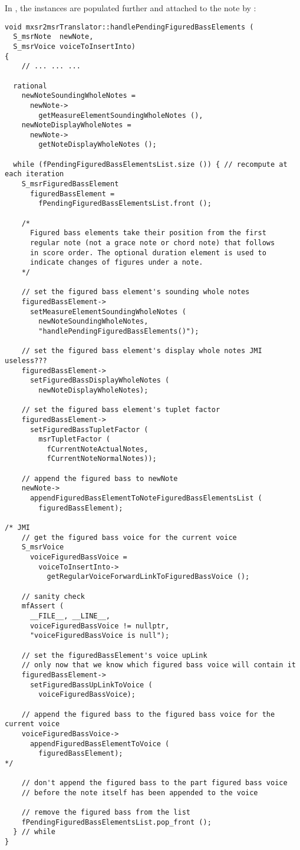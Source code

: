 In , the  instances are populated further and attached to the note by :
\begin{lstlisting}[language=CPlusPlus]
void mxsr2msrTranslator::handlePendingFiguredBassElements (
  S_msrNote  newNote,
  S_msrVoice voiceToInsertInto)
{
	// ... ... ...

  rational
    newNoteSoundingWholeNotes =
      newNote->
        getMeasureElementSoundingWholeNotes (),
    newNoteDisplayWholeNotes =
      newNote->
        getNoteDisplayWholeNotes ();

  while (fPendingFiguredBassElementsList.size ()) { // recompute at each iteration
    S_msrFiguredBassElement
      figuredBassElement =
        fPendingFiguredBassElementsList.front ();

    /*
      Figured bass elements take their position from the first
      regular note (not a grace note or chord note) that follows
      in score order. The optional duration element is used to
      indicate changes of figures under a note.
    */

    // set the figured bass element's sounding whole notes
    figuredBassElement->
      setMeasureElementSoundingWholeNotes (
        newNoteSoundingWholeNotes,
        "handlePendingFiguredBassElements()");

    // set the figured bass element's display whole notes JMI useless???
    figuredBassElement->
      setFiguredBassDisplayWholeNotes (
        newNoteDisplayWholeNotes);

    // set the figured bass element's tuplet factor
    figuredBassElement->
      setFiguredBassTupletFactor (
        msrTupletFactor (
          fCurrentNoteActualNotes,
          fCurrentNoteNormalNotes));

    // append the figured bass to newNote
    newNote->
      appendFiguredBassElementToNoteFiguredBassElementsList (
        figuredBassElement);

/* JMI
    // get the figured bass voice for the current voice
    S_msrVoice
      voiceFiguredBassVoice =
        voiceToInsertInto->
          getRegularVoiceForwardLinkToFiguredBassVoice ();

    // sanity check
    mfAssert (
      __FILE__, __LINE__,
      voiceFiguredBassVoice != nullptr,
      "voiceFiguredBassVoice is null");

    // set the figuredBassElement's voice upLink
    // only now that we know which figured bass voice will contain it
    figuredBassElement->
      setFiguredBassUpLinkToVoice (
        voiceFiguredBassVoice);

    // append the figured bass to the figured bass voice for the current voice
    voiceFiguredBassVoice->
      appendFiguredBassElementToVoice (
        figuredBassElement);
*/

    // don't append the figured bass to the part figured bass voice
    // before the note itself has been appended to the voice

    // remove the figured bass from the list
    fPendingFiguredBassElementsList.pop_front ();
  } // while
}
\end{lstlisting}

